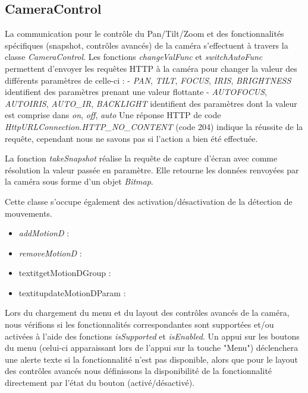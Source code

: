 \subsection{CameraControl}
La communication pour le contrôle du Pan/Tilt/Zoom et des fonctionnalités spécifiques (snapshot, contrôles avancés) de la caméra s'effectuent à travers la classe \textit{CameraControl}.
Les fonctions \textit{changeValFunc} et \textit{switchAutoFunc} permettent d'envoyer les requêtes HTTP à la caméra pour changer la valeur des différents paramètres de celle-ci :
- \textit{PAN}, \textit{TILT}, \textit{FOCUS}, \textit{IRIS}, \textit{BRIGHTNESS} identifient des paramètres prenant une valeur flottante
- \textit{AUTOFOCUS}, \textit{AUTOIRIS}, \textit{AUTO_IR}, \textit{BACKLIGHT} identifient des paramètres dont la valeur est comprise dans { \textit{on}, \textit{off}, \textit{auto} }
Une réponse HTTP de code \textit{HttpURLConnection.HTTP_NO_CONTENT} (code 204) indique la réussite de la requête, cependant nous ne savons pas si l'action a bien été effectuée.

La fonction \textit{takeSnapshot} réalise la requête de capture d'écran avec comme résolution la valeur passée en paramètre.
Elle retourne les données renvoyées par la caméra sous forme d'un objet \textit{Bitmap}.

Cette classe s'occupe également des activation/désactivation de la détection de mouvements.
\begin{itemize}
	\item \textit{addMotionD} : 
	\item \textit{removeMotionD} : 
	\item textit{getMotionDGroup} : 
	\item textit{updateMotionDParam} : 
\end{itemize}

Lors du chargement du menu et du layout des contrôles avancés de la caméra, nous vérifions si les fonctionnalités correspondantes sont supportées et/ou activées à l'aide des fonctions
\textit{isSupported} et \textit{isEnabled}. Un appui sur les boutons du menu (celui-ci apparaissant lors de l'appui sur la touche "Menu") déclenchera une alerte texte si la fonctionnalité n'est pas
disponible, alors que pour le layout des contrôles avancés nous définissons la disponibilité de la fonctionnalité directement par l'état du bouton (activé/désactivé).


